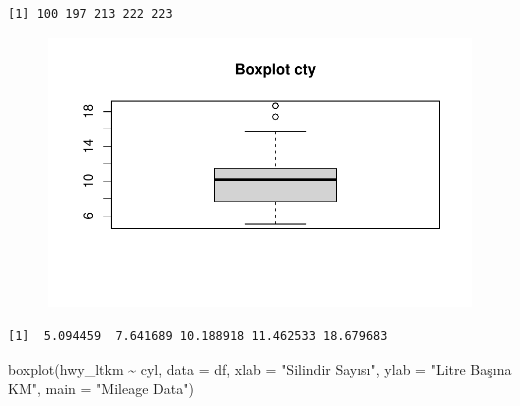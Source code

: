 \documentclass[
  letterpaper,
  DIV=11,
  numbers=noendperiod]{scrreprt}
\newenvironment{Shaded}{\begin{snugshade}}{\end{snugshade}}
\newcommand{\AttributeTok}[1]{\textcolor[rgb]{0.40,0.45,0.13}{#1}}
\newcommand{\CommentTok}[1]{\textcolor[rgb]{0.37,0.37,0.37}{#1}}
\newcommand{\FunctionTok}[1]{\textcolor[rgb]{0.28,0.35,0.67}{#1}}
\newcommand{\NormalTok}[1]{\textcolor[rgb]{0.00,0.23,0.31}{#1}}
\newcommand{\SpecialCharTok}[1]{\textcolor[rgb]{0.37,0.37,0.37}{#1}}
\newcommand{\StringTok}[1]{\textcolor[rgb]{0.13,0.47,0.30}{#1}}
\begin{document}
\begin{verbatim}
[1] 100 197 213 222 223
\end{verbatim}

\begin{Shaded}
\end{Shaded}

\begin{figure}[H]

{\centering \includegraphics{data_analysis_files/figure-pdf/unnamed-chunk-2-5.pdf}

}

\end{figure}

\begin{Shaded}
\end{Shaded}

\begin{verbatim}
[1]  5.094459  7.641689 10.188918 11.462533 18.679683
\end{verbatim}

\begin{Shaded}
\begin{Highlighting}[]
\FunctionTok{boxplot}\NormalTok{(hwy\_ltkm }\SpecialCharTok{\textasciitilde{}}\NormalTok{ cyl, }\AttributeTok{data =}\NormalTok{ df, }\AttributeTok{xlab =} \StringTok{"Silindir Sayısı"}\NormalTok{,}
   \AttributeTok{ylab =} \StringTok{"Litre Başına KM"}\NormalTok{, }\AttributeTok{main =} \StringTok{"Mileage Data"}\NormalTok{)}
\end{Highlighting}
\end{Shaded}
\end{document}
